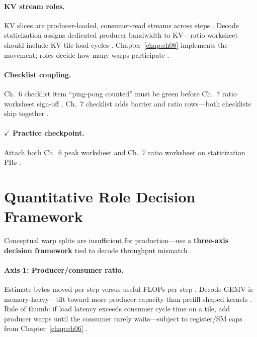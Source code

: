 \paragraph{KV stream roles.}
KV slices are producer-loaded, consumer-read streams across steps \citep{kwon2023vllm,dao2023flashdecoding,semianalysis2024tma}.
Decode staticization assigns dedicated producer bandwidth to KV---ratio worksheet should include KV tile load cycles \citep{patel2025llminference,yirage2026,shah2024flashattention3}.
Chapter~\ref{chap:ch08} implements the movement; roles decide how many warps participate \citep{semianalysis2024tma,dao2022flashattention}.

\paragraph{Checklist coupling.}
Ch.~6 checklist item ``ping-pong counted'' must be green before Ch.~7 ratio worksheet sign-off \citep{yirage2026,chen2020compilerbasedhardw,dao2022flashattention}.
Ch.~7 checklist adds barrier and ratio rows---both checklists ship together \citep{patel2025llminference,taxbreak2026}.

\paragraph{$\checkmark$ Practice checkpoint.}
Attach both Ch.~6 peak worksheet and Ch.~7 ratio worksheet on staticization PRs \citep{yirage2026,chen2020compilerbasedhardw,dao2022flashattention}.

\section{Quantitative Role Decision Framework}
\label{sec:ch07_role_decision}

Conceptual warp splits are insufficient for production---use a \textbf{three-axis decision framework} tied to decode throughput mismatch \citep{shah2024flashattention3,patel2025llminference,yirage2026}.

\paragraph{Axis 1: Producer/consumer ratio.}
Estimate bytes moved per step versus useful FLOPs per step \citep{memoryfloor2026,dao2022flashattention}.
Decode GEMV is memory-heavy---tilt toward more producer capacity than prefill-shaped kernels \citep{kwon2023vllm,taxbreak2026}.
Rule of thumb: if load latency exceeds consumer cycle time on a tile, add producer warps until the consumer rarely waits---subject to register/SM caps from Chapter~\ref{chap:ch06} \citep{yirage2026,nvidia2022hopper}.

